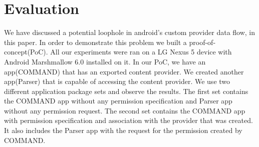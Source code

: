 \section{Evaluation}
\label{eval}
We have discussed a potential loophole in android's custom provider data flow, in this paper. In order to demonstrate this problem we built a proof-of-concept(PoC). All our experiments were ran on a LG Nexus 5 device with Android Marshmallow 6.0 installed on it. In our PoC, we have an app(COMMAND) that has an exported content provider. We created another app(Parser) that is capable of accessing the content provider. We use two different application package sets and observe the results. The first set contains the COMMAND app without any permission specification and Parser app without any permission request. The second set contains the COMMAND app with permission specification and association with the provider that was created. It also includes the Parser app with the request for the permission created by COMMAND.

